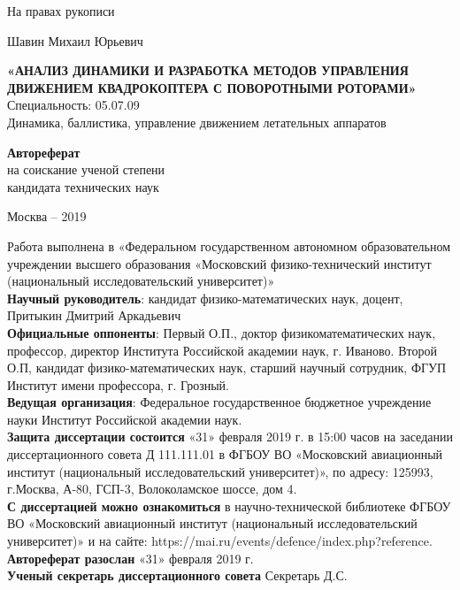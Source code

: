 \thispagestyle{empty}

{
	\vskip 5mm
}

\begin{flushright}
	На правах рукописи
\end{flushright}


{
	\vskip 45mm
}

\begin{center}
	Шавин Михаил Юрьевич
\end{center}
\begin{center} 
	\textbf{«АНАЛИЗ ДИНАМИКИ И РАЗРАБОТКА МЕТОДОВ УПРАВЛЕНИЯ ДВИЖЕНИЕМ КВАДРОКОПТЕРА С ПОВОРОТНЫМИ РОТОРАМИ»} \\
	Специальность: 05.07.09 \\
	Динамика, баллистика, управление движением летательных аппаратов
\end{center}

{
	\vskip 20mm
}

\begin{center} 
	\textbf{Автореферат} \\
	на соискание ученой степени \\
	кандидата технических наук
\end{center}


{
	\vskip 55mm
}

\begin{center} 
	Москва -- 2019
\end{center}

\newpage %

Работа выполнена в «Федеральном государственном автономном образовательном учреждении
высшего образования «Московский физико-технический институт (национальный исследовательский университет)» \\
\textbf{Научный руководитель}: кандидат физико-математических наук, доцент, Притыкин Дмитрий Аркадьевич \\
\textbf{Официальные оппоненты}:
Первый О.П., доктор физикоматематических наук, профессор, директор Института Российской академии наук, г. Иваново. Второй О.П, кандидат физико-математических наук, старший научный сотрудник, ФГУП Институт имени профессора, г. Грозный. \\
\textbf{Ведущая организация}:
Федеральное государственное бюджетное учреждение науки Институт Российской академии наук.\\
\textbf{Защита диссертации состоится} «31» февраля 2019 г. в 15:00 часов на заседании
диссертационного совета Д 111.111.01 в ФГБОУ ВО «Московский авиационный институт (национальный исследовательский университет)»,
по адресу: 125993, г.Москва, А-80, ГСП-3, Волоколамское шоссе, дом 4. \\
\textbf{С диссертацией можно ознакомиться} в научно-технической библиотеке ФГБОУ ВО «Московский авиационный институт (национальный исследовательский университет)»
и на сайте:
https://mai.ru/events/defence/index.php?reference. \\
\textbf{Автореферат разослан} «31» февраля 2019 г. \\
\textbf{Ученый секретарь диссертационного совета} Секретарь Д.С.